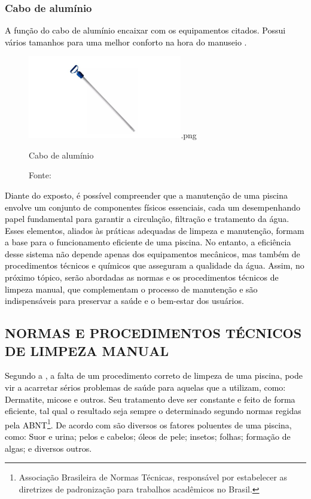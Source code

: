         \subsubsection*{Cabo de alumínio}

         \textcolor{black}{A função do cabo de alumínio encaixar com os equipamentos citados. Possui vários tamanhos para uma melhor conforto na hora do manuseio \cite{benedito2024projeto}.}

            \begin{figure}[H]
                \centering
                \caption{ }  
                \centering
                \label{fig:cont}
                \includegraphics[width=0.60\textwidth]{imagens/cabo}.png
                \caption*{Cabo de alumínio}
                \caption*{Fonte: \cite{benedito2024projeto}}
            \end{figure}

        \textcolor{black}{Diante do exposto, é possível compreender que a manutenção de uma piscina envolve um conjunto de componentes físicos essenciais, cada um desempenhando papel fundamental para garantir a circulação, filtração e tratamento da água. Esses elementos, aliados às práticas adequadas de limpeza e manutenção, formam a base para o funcionamento eficiente de uma piscina. No entanto, a eficiência desse sistema não depende apenas dos equipamentos mecânicos, mas também de procedimentos técnicos e químicos que asseguram a qualidade da água. Assim, no próximo tópico, serão abordadas as normas e os procedimentos técnicos de limpeza manual, que complementam o processo de manutenção e são indispensáveis para preservar a saúde e o bem-estar dos usuários.}
        

    \subsection{NORMAS E PROCEDIMENTOS TÉCNICOS DE LIMPEZA MANUAL}

       \textcolor{black}{Segundo a \cite{piscineiroProfissional}, a falta de um procedimento correto de limpeza de uma piscina, pode vir a acarretar sérios problemas de saúde para aquelas que a utilizam, como: Dermatite, micose e outros. Seu tratamento deve ser constante e feito de forma eficiente, tal qual o resultado seja sempre o determinado segundo normas regidas pela ABNT\footnote{Associação Brasileira de Normas Técnicas, responsável por estabelecer as diretrizes de padronização para trabalhos acadêmicos no Brasil.}. De acordo com \cite{guiaTratamento} são diversos os fatores poluentes de uma piscina, como: Suor e urina; pelos e cabelos; óleos de pele; insetos; folhas; formação de algas; e diversos outros.}

